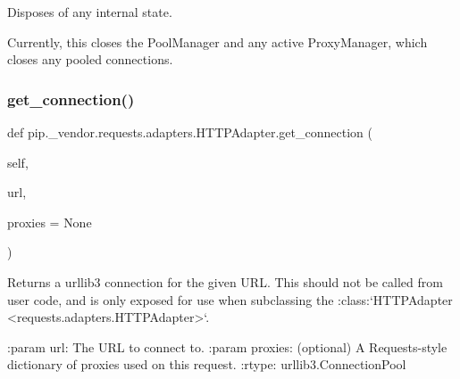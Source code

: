 \begin{DoxyVerb}Disposes of any internal state.

Currently, this closes the PoolManager and any active ProxyManager,
which closes any pooled connections.
\end{DoxyVerb}
 \mbox{\label{classpip_1_1__vendor_1_1requests_1_1adapters_1_1HTTPAdapter_aa378d84f3fc4067c3bbe88ebc8304f9b}} 
\subsubsection{\texorpdfstring{get\+\_\+connection()}{get\_connection()}}
{\footnotesize\ttfamily def pip.\+\_\+vendor.\+requests.\+adapters.\+H\+T\+T\+P\+Adapter.\+get\+\_\+connection (\begin{DoxyParamCaption}\item[{}]{self,  }\item[{}]{url,  }\item[{}]{proxies = {\ttfamily None} }\end{DoxyParamCaption})}

\begin{DoxyVerb}Returns a urllib3 connection for the given URL. This should not be
called from user code, and is only exposed for use when subclassing the
:class:`HTTPAdapter <requests.adapters.HTTPAdapter>`.

:param url: The URL to connect to.
:param proxies: (optional) A Requests-style dictionary of proxies used on this request.
:rtype: urllib3.ConnectionPool
\end{DoxyVerb}
 \mbox{\label{classpip_1_1__vendor_1_1requests_1_1adapters_1_1HTTPAdapter_a40dcd38587377f194d9e1347e8b2e709}} 
